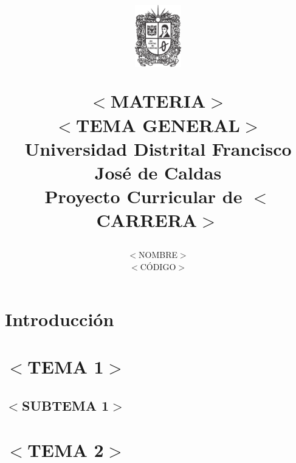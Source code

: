 \documentclass[12pt]{article}
\title{
\vspace{-30mm}\begin{figure}[h]
\centering
\includegraphics[width=0.8in]{logoUD}
\label{escudo}
\end{figure}$<$MATERIA$>$\\$<$TEMA GENERAL$>$\\\Large Universidad Distrital Francisco José de Caldas\\Proyecto Curricular de $<$CARRERA$>$}
\author{$<$NOMBRE$>$\\$<$CÓDIGO$>$}
\begin{document}
\maketitle
\section{Introducción}
\lipsum[2]
\section{$<$TEMA 1$>$}
\lipsum[1]
\subsection{$<$SUBTEMA 1$>$}
\lipsum[3]
\section{$<$TEMA 2$>$}
\lipsum[1]
\begin{thebibliography}{00}
\end{thebibliography}
\end{document}
